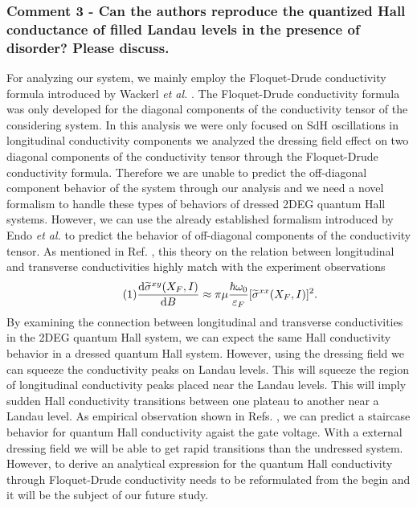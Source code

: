 \documentclass{article}
\begin{document}
\subsubsection*{Comment 3 -
\color{RoyalBlue} Can the authors reproduce the quantized Hall conductance of filled Landau levels in the presence of disorder? Please discuss.
}

For analyzing our system, we mainly employ the Floquet-Drude conductivity formula introduced by Wackerl \textit{et al.} \cite{wackerl20}. The Floquet-Drude conductivity formula was only developed for the diagonal components of the conductivity tensor of the considering system. In this analysis we were only focused on SdH oscillations in longitudinal conductivity components we analyzed the dressing field effect on two diagonal components of the conductivity tensor through the Floquet-Drude conductivity formula. Therefore we are unable to predict the off-diagonal component behavior of the system through our analysis and we need a novel formalism to handle these types of behaviors of dressed 2DEG quantum Hall systems. However, we can use the already established formalism introduced by Endo \textit{et al.} \cite{endo09} to predict the behavior of off-diagonal components of the conductivity tensor. As mentioned in Ref. \cite{endo09}, this theory on the relation between longitudinal and transverse conductivities highly match with the experiment observations
\begin{equation} \tag{1}
  \dv{\widetilde{\sigma}^{xy}(X_F,I)}{B} \approx
    \pi\mu \frac{\hbar \omega_0}{\varepsilon_F} [\widetilde{\sigma}^{xx}(X_F,I)]^2.
\end{equation}
By examining the connection between longitudinal and transverse conductivities in the 2DEG quantum Hall system, we can expect the same Hall conductivity behavior in a dressed quantum Hall system. However, using the dressing field we can squeeze the conductivity peaks on Landau levels. This will squeeze the region of longitudinal conductivity peaks placed near the Landau levels. This will imply sudden Hall conductivity transitions between one plateau to another near a Landau level. As empirical observation shown in Refs.  \cite{klitzing80,gusynin06}, we can predict a staircase behavior for quantum Hall conductivity agaist the gate voltage. With a external dressing field we will be able to get rapid transitions than the undressed system. However, to derive an analytical expression for the quantum Hall conductivity through Floquet-Drude conductivity needs to be reformulated from the begin and it will be the subject of our future study.
\end{document}
